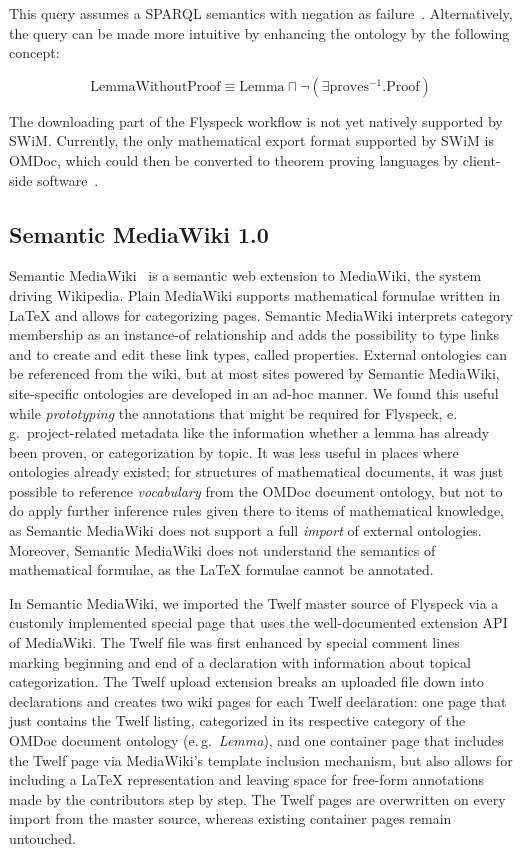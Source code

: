 \documentclass{llncs}
\begin{document}
This query assumes a SPARQL semantics with negation as failure~\cite{Polleres:SPARQL-Rules07}.  Alternatively, the query
can be made more intuitive by enhancing the ontology by the following concept:

\[
\mbox{LemmaWithoutProof}\equiv\mbox{Lemma}\sqcap\neg(\exists\mbox{proves}^{-1}.\mbox{Proof})
\]

The downloading part of the Flyspeck workflow is not yet natively supported by SWiM.
Currently, the only mathematical export format supported by SWiM is OMDoc, which could
then be converted to theorem proving languages by client-side software~\cite[chap.\
25.2]{Kohlhase:omdoc1.2}.

\subsection{Semantic MediaWiki 1.0}
\label{sec:smw-study}

Semantic MediaWiki~\cite{KrSchVr:semwiki-reasoning07} is a semantic web extension to
MediaWiki, the system driving Wikipedia.  Plain MediaWiki supports mathematical formulae
written in {\LaTeX} and allows for categorizing pages.  Semantic MediaWiki interprets
category membership as an instance-of relationship and adds the possibility to type links
and to create and edit these link types, called properties.  External ontologies can be
referenced from the wiki, but at most sites powered by Semantic MediaWiki, site-specific
ontologies are developed in an ad-hoc manner.  We found this useful while
\emph{prototyping} the annotations that might be required for Flyspeck, e.\,g.\
project-related metadata like the information whether a lemma has already been proven, or
categorization by topic.  It was less useful in places where ontologies already existed;
for structures of mathematical documents, it was just possible to reference
\emph{vocabulary} from the OMDoc document ontology, but not to do apply further inference
rules given there to items of mathematical knowledge, as Semantic MediaWiki does not
support a full \emph{import} of external ontologies.  Moreover, Semantic MediaWiki does
not understand the semantics of mathematical formulae, as the {\LaTeX} formulae cannot be
annotated.

In Semantic MediaWiki, we imported the Twelf master source of Flyspeck via a customly
implemented special page that uses the well-documented extension API of MediaWiki.  The
Twelf file was first enhanced by special comment lines marking beginning and end of a
declaration\ednote{@Sean/Florian: What's the general term?} with information about topical
categorization.  The Twelf upload extension breaks an uploaded file down into declarations
and creates two wiki pages for each Twelf declaration: one page that just contains the
Twelf listing, categorized in its respective category of the OMDoc document ontology
(e.\,g.\ \textit{Lemma}), and one container page that includes the Twelf page via
MediaWiki's template inclusion mechanism, but also allows for including a {\LaTeX}
representation and leaving space for free-form annotations made by the contributors step
by step.  The Twelf pages are overwritten on every import from the master source, whereas
existing container pages remain untouched.
\end{document}
